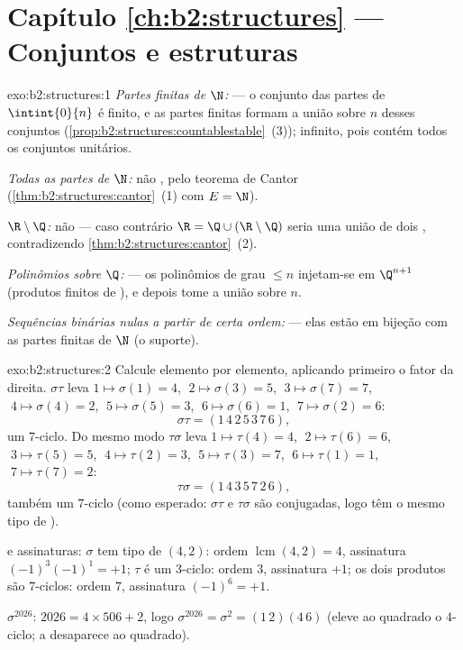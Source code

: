 \section*{Capítulo \ref{ch:b2:structures} --- Conjuntos e estruturas}

\begin{solution}{exo:b2:structures:1}
\emph{Partes finitas de $\N$:}  --- o conjunto das partes de
$\intint{0}{n}$ é finito, e as partes finitas formam a união 
sobre $n$ desses conjuntos
(\cref{prop:b2:structures:countablestable}~(3)); infinito, pois
contém todos os conjuntos unitários.

\emph{Todas as partes de $\N$:} não , pelo teorema de Cantor
(\cref{thm:b2:structures:cantor}~(1) com $E = \N$).

\emph{$\R \setminus \Q$:} não  --- caso contrário $\R = \Q \cup
(\R\setminus\Q)$ seria uma união de dois ,
contradizendo \cref{thm:b2:structures:cantor}~(2).

\emph{Polinômios sobre $\Q$:}  --- os polinômios de grau
$\leq n$ injetam-se em $\Q^{n+1}$ (produtos finitos de ),
e depois tome a união sobre $n$.

\emph{Sequências binárias nulas a partir de certa ordem:}  --- elas estão em bijeção com as
partes finitas de $\N$ (o suporte).
\end{solution}

\begin{solution}{exo:b2:structures:2}
Calcule elemento por elemento, aplicando primeiro o fator da direita.
$\sigma\tau$ leva $1 \mapsto \sigma(1) = 4$, $\;2 \mapsto \sigma(3)
= 5$, $\;3 \mapsto \sigma(7) = 7$, $\;4 \mapsto \sigma(4) = 2$, $\;5
\mapsto \sigma(5) = 3$, $\;6 \mapsto \sigma(6) = 1$, $\;7 \mapsto
\sigma(2) = 6$:
\[
\sigma\tau = (1\,4\,2\,5\,3\,7\,6),
\]
um $7$-ciclo. Do mesmo modo $\tau\sigma$ leva $1 \mapsto \tau(4) = 4$,
$\;2 \mapsto \tau(6) = 6$, $\;3 \mapsto \tau(5) = 5$, $\;4 \mapsto
\tau(2) = 3$, $\;5 \mapsto \tau(3) = 7$, $\;6 \mapsto \tau(1) = 1$,
$\;7 \mapsto \tau(7) = 2$:
\[
\tau\sigma = (1\,4\,3\,5\,7\,2\,6),
\]
também um $7$-ciclo (como esperado: $\sigma\tau$ e $\tau\sigma$ são
conjugadas, logo têm o mesmo tipo de ).

 e assinaturas: $\sigma$ tem tipo de  $(4,2)$: ordem
$\operatorname{lcm}(4,2) = 4$, assinatura $(-1)^3(-1)^1 = +1$; $\tau$
é um $3$-ciclo: ordem $3$, assinatura $+1$; os dois produtos são
$7$-ciclos: ordem $7$, assinatura $(-1)^6 = +1$.

$\sigma^{2026}$: $2026 = 4 \times 506 + 2$, logo $\sigma^{2026} =
\sigma^2 = (1\,2)(4\,6)$ (eleve ao quadrado o $4$-ciclo; a 
desaparece ao quadrado).
\end{solution}

